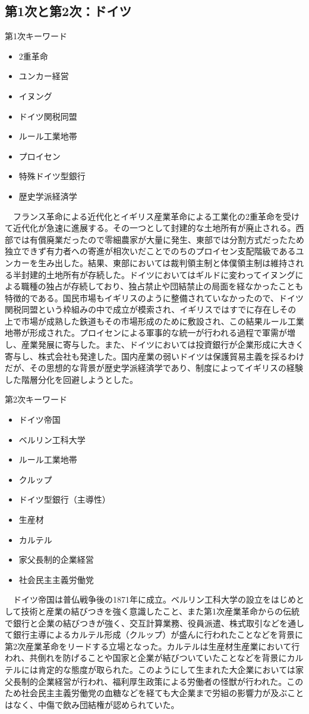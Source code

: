 \documentclass{jsarticle}
\begin{document}
\subsection{第1次と第2次：ドイツ}
第1次キーワード
\begin{itemize}
\item 2重革命
\item ユンカー経営
\item イヌング
\item ドイツ関税同盟
\item ルール工業地帯
\item プロイセン
\item 特殊ドイツ型銀行
\item 歴史学派経済学
\end{itemize}
　フランス革命による近代化とイギリス産業革命による工業化の2重革命を受けて近代化が急速に進展する。その一つとして封建的な土地所有が廃止される。西部では有償廃業だったので零細農家が大量に発生、東部では分割方式だったため独立できず有力者への寄進が相次いだことでのちのプロイセン支配階級であるユンカーを生み出した。結果、東部においては裁判領主制と体僕領主制は維持される半封建的土地所有が存続した。ドイツにおいてはギルドに変わってイヌングによる職種の独占が存続しており、独占禁止や団結禁止の局面を経なかったことも特徴的である。国民市場もイギリスのように整備されていなかったので、ドイツ関税同盟という枠組みの中で成立が模索され、イギリスではすでに存在しその上で市場が成熟した鉄道もその市場形成のために敷設され、この結果ルール工業地帯が形成された。プロイセンによる軍事的な統一が行われる過程で軍需が増し、産業発展に寄与した。また、ドイツにおいては投資銀行が企業形成に大きく寄与し、株式会社も発達した。国内産業の弱いドイツは保護貿易主義を採るわけだが、その思想的な背景が歴史学派経済学であり、制度によってイギリスの経験した階層分化を回避しようとした。

第2次キーワード
\begin{itemize}
\item ドイツ帝国
\item ベルリン工科大学
\item ルール工業地帯
\item クルップ
\item ドイツ型銀行（主導性）
\item 生産材
\item カルテル
\item 家父長制的企業経営
\item 社会民主主義労働党
\end{itemize}
　ドイツ帝国は普仏戦争後の1871年に成立。ベルリン工科大学の設立をはじめとして技術と産業の結びつきを強く意識したこと、また第1次産業革命からの伝統で銀行と企業の結びつきが強く、交互計算業務、役員派遣、株式取引などを通して銀行主導によるカルテル形成（クルップ）が盛んに行われたことなどを背景に第2次産業革命をリードする立場となった。カルテルは生産材生産業において行われ、共倒れを防げることや国家と企業が結びついていたことなどを背景にカルテルには肯定的な態度が取られた。このようにして生まれた大企業においては家父長制的企業経営が行われ、福利厚生政策による労働者の怪獣が行われた。このため社会民主主義労働党の血糖などを経ても大企業まで労組の影響力が及ぶことはなく、中傷で飲み団結権が認められていた。
\end{document}
